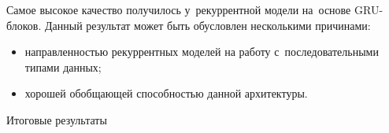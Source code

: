Самое высокое качество получилось у~рекуррентной модели на~основе GRU-блоков.
Данный результат может быть обусловлен несколькими причинами:
\begin{itemize}
	\item направленностью рекуррентных моделей на работу с~последовательными типами данных;
	\item хорошей обобщающей способностью данной архитектуры.
\end{itemize}

\begin{landscape}
\begin{table}[h]\centering
	\label{res_table}
	\caption{Итоговые результаты}\bigskip
	
	
\end{table}
\end{landscape}
